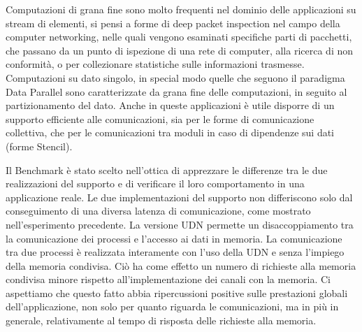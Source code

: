 Computazioni di grana fine sono molto frequenti nel dominio delle applicazioni su stream di elementi, si pensi a forme di deep packet inspection nel campo della computer networking, nelle quali vengono esaminati specifiche parti di pacchetti, che passano da un punto di ispezione di una rete di computer, alla ricerca di non conformit\`a, o per collezionare statistiche sulle informazioni trasmesse. Computazioni su dato singolo, in special modo quelle che seguono il paradigma Data Parallel sono caratterizzate da grana fine delle computazioni, in seguito al partizionamento del dato. Anche in queste applicazioni \`e utile disporre di un supporto efficiente alle comunicazioni, sia per le forme di comunicazione collettiva, che per le comunicazioni tra moduli in caso di dipendenze sui dati (forme Stencil).

Il Benchmark \`e stato scelto nell'ottica di apprezzare le differenze tra le due realizzazioni del supporto e di verificare il loro comportamento in una applicazione reale. Le due implementazioni del supporto non differiscono solo dal conseguimento di una diversa latenza di comunicazione, come mostrato nell'esperimento precedente. La versione UDN permette un disaccoppiamento tra la comunicazione dei processi e l'accesso ai dati in memoria. La comunicazione tra due processi \`e realizzata interamente con l'uso della UDN e senza l'impiego della memoria condivisa. Ci\`o ha come effetto un numero di richieste alla memoria condivisa minore rispetto all'implementazione dei canali con la memoria. Ci aspettiamo che questo fatto abbia ripercussioni positive sulle prestazioni globali dell'applicazione, non solo per quanto riguarda le comunicazioni, ma in pi\`u in generale, relativamente al tempo di risposta delle richieste alla memoria.
  

